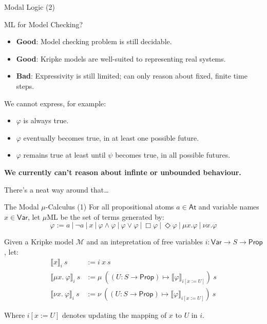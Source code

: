 \documentclass[aspectratio=169]{beamer}
\newcommand{\meaningof}[1]{\ensuremath{\llbracket #1 \rrbracket}}
\begin{document}
\begin{frame}{Modal Logic (2)}

\begin{block}{ML for Model Checking?}
\begin{itemize}
  \item \textbf{Good}: Model checking problem is still decidable.
        \smallskip{}
  \item \textbf{Good}: Kripke models are well-suited to representing real systems.
        \smallskip{}
  \item \textbf{Bad}: Expressivity is still limited; can only reason about fixed, finite time steps.
\end{itemize}
\end{block}

\bigskip
\pause

We cannot express, for example:

\begin{itemize}
  \item $\varphi$ is always true.
  \item $\varphi$ eventually becomes true, in at least one possible future.
  \item $\varphi$ remains true at least until $\psi$ becomes true, in all possible futures.
\end{itemize}

\center \textbf{We currently can't reason about infinte or unbounded behaviour.}

\center There's a neat way around that\ldots

\end{frame}

\begin{frame}{The Modal $\mu$-Calculus (1)}
  For all propositional atoms $a \in \mathsf{At}$ and variable names $x \in \mathsf{Var}$, let $\mu$ML be the set of terms generated by:
  \begin{equation*}
    \varphi := a~|~\neg a~|~x~|~\varphi \land \varphi~|~\varphi \lor \varphi~|~\Box \varphi~|~\Diamond \varphi~|~\mu x. \varphi~|~\nu x. \varphi
  \end{equation*}

  \bigskip
  \pause

  Given a Kripke model $\mathcal{M}$ and an intepretation of free variables $i : \mathsf{Var} \to S \to \mathsf{Prop}$, let:
  \begin{align*}
    \meaningof{x}_{i}~s &:= i~x~s \\
    \meaningof{\mu x.~\varphi}_{i}~s &:= \mu~((U : S \to \mathsf{Prop}) \mapsto \meaningof{\varphi}_{i[x:=U]})~s \\
    \meaningof{\nu x.~\varphi}_{i}~s &:= \nu~((U : S \to \mathsf{Prop}) \mapsto \meaningof{\varphi}_{i[x:=U]})~s
  \end{align*}

  Where $i[x:=U]$ denotes updating the mapping of $x$ to $U$ in $i$.
\end{frame}
\end{document}
